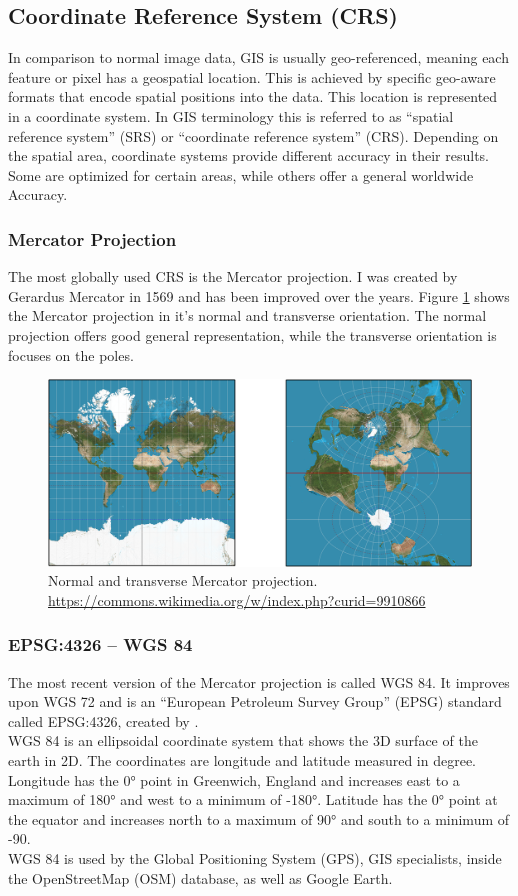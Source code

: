 \subsection{Coordinate Reference System (CRS)}
In comparison to normal image data, GIS is usually geo-referenced, meaning each feature or pixel has a geospatial location. This is achieved by specific geo-aware formats that encode spatial positions into the data. This location is represented in a coordinate system. In GIS terminology this is referred to as \enquote{spatial reference system} (SRS) or \enquote{coordinate reference system} (CRS). Depending on the spatial area, coordinate systems provide different accuracy in their results. Some are optimized for certain areas, while others offer a general worldwide Accuracy.

\subsubsection{Mercator Projection}
The most globally used CRS is the Mercator projection. I was created by Gerardus Mercator in 1569 and has been improved over the years. Figure \ref{fig:mercator} shows the Mercator projection in it's normal and transverse orientation. The normal projection offers good general representation, while the transverse orientation is focuses on the poles.
\begin{figure}[H]
	\centering\includegraphics[width=1\textwidth]{res/Mercator}
	\caption{Normal and transverse Mercator projection. \url{https://commons.wikimedia.org/w/index.php?curid=9910866}}
	\label{fig:mercator}
\end{figure}

\subsubsection{EPSG:4326 -- WGS 84}
The most recent version of the Mercator projection is called WGS 84. It improves upon WGS 72 and is an \enquote{European Petroleum Survey Group} (EPSG) standard called EPSG:4326, created by \cite{Decker1986}.\\
WGS 84 is an ellipsoidal coordinate system that shows the 3D surface of the earth in 2D. The coordinates are longitude and latitude measured in degree. Longitude has the 0° point in Greenwich, England and increases east to a maximum of 180° and west to a minimum of -180°. Latitude has the 0° point at the equator and increases north to a maximum of 90° and south to a minimum of -90.\\
WGS 84 is used by the Global Positioning System (GPS), GIS specialists, inside the OpenStreetMap (OSM) database, as well as Google Earth.

